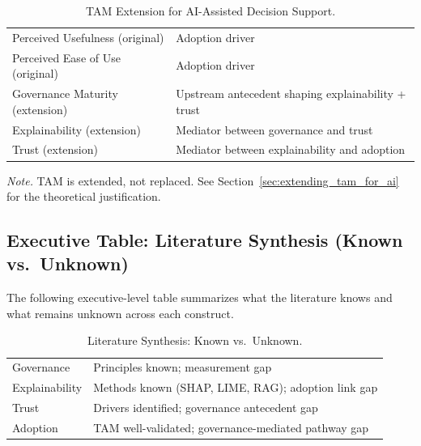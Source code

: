 {\tablestripes\tablefontsize
{}
\begin{xltabular}{\textwidth}{@{} >{\raggedright\arraybackslash}p{6cm} L @{}}
\caption[TAM Extension for AI-Assisted Decision Support]{TAM Extension for AI-Assisted Decision Support.}\label{tab:exec_tam_extension} \\
\toprule
{} &  \\
\midrule
\endfirsthead
\endhead
\bottomrule
\endlastfoot
Perceived Usefulness (original) & Adoption driver \\
\addlinespace
Perceived Ease of Use (original) & Adoption driver \\
\addlinespace
Governance Maturity (extension) & Upstream antecedent shaping explainability + trust \\
\addlinespace
Explainability (extension) & Mediator between governance and trust \\
\addlinespace
Trust (extension) & Mediator between explainability and adoption \\
\end{xltabular}}
\vspace{0.3em}\noindent\textit{Note.} TAM is extended, not replaced. See Section~\ref{sec:extending_tam_for_ai} for the theoretical justification.


\subsection{Executive Table: Literature Synthesis (Known vs.\ Unknown)}
\label{sec:exec_lit_synthesis_table}

\noindent The following executive-level table summarizes what the literature knows and what remains unknown across each construct.

{\tablestripes\tablefontsize
{}
\begin{xltabular}{\textwidth}{@{} >{\raggedright\arraybackslash}p{6cm} L @{}}
\caption[Literature Synthesis: Known vs.\ Unknown]{Literature Synthesis: Known vs.\ Unknown.}\label{tab:exec_lit_synthesis_table} \\
\toprule
{} &  \\
\midrule
\endfirsthead
\endhead
\bottomrule
\endlastfoot
Governance & Principles known; measurement gap \\
\addlinespace
Explainability & Methods known (SHAP, LIME, RAG); adoption link gap \\
\addlinespace
Trust & Drivers identified; governance antecedent gap \\
\addlinespace
Adoption & TAM well-validated; governance-mediated pathway gap \\
\end{xltabular}}


